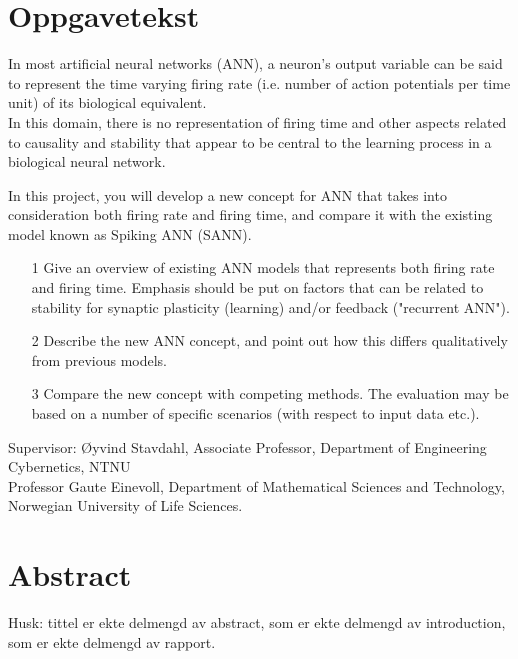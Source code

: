 







%

\newpage
\section{Oppgavetekst}
In most artificial neural networks (ANN),  a neuron's output variable can be said to represent the time varying firing rate (i.e. number of action potentials per time unit) of its biological equivalent.\\
In this domain, there is no representation of firing time and other aspects related to causality and stability that appear to be central to the learning process in a biological neural network.
 
 In this project, you will develop a new concept for ANN that takes into consideration both firing rate and firing time, and compare it with the existing model known as Spiking ANN (SANN).
 \begin{itemize} 
  \item[1] Give an overview of existing ANN models that represents both firing rate and firing time. Emphasis should be put on factors that can be related to stability for synaptic plasticity (learning) and/or feedback ("recurrent ANN").
  \item[2] Describe the new ANN concept, and point out how this differs qualitatively from previous models.
  \item[3] Compare the new concept with competing methods. The evaluation may be based on a number of specific scenarios (with respect to input data etc.).
 \end{itemize}

 Supervisor:      Øyvind Stavdahl, Associate Professor, Department of Engineering Cybernetics, NTNU\\
                  Professor Gaute Einevoll, Department of Mathematical Sciences and Technology, Norwegian University of Life Sciences.
\newpage

\section{Abstract}
Husk: tittel er ekte delmengd av abstract, som er ekte delmengd av introduction, som er ekte delmengd av rapport.

